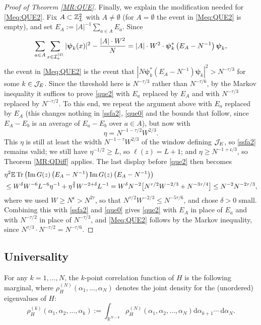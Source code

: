 \begin{proof}[Proof of Theorem \ref{MR:QUE}]
{Finally, we explain the modification needed for \eqref{Meq:QUE2}. Fix $A\subset\mathbb{Z}_{L}^{2}$ with $A\neq\emptyset$ (for $A=\emptyset$ the event in \eqref{Meq:QUE2} is empty), and set $E_{A}:=|A|^{-1}\sum_{a\in A}E_{a}$. Since
$$
\sum_{a\in A}\sum_{x\in{\cal I}^{(2)}_{a}}|\boldsymbol{\psi}_{k}(x)|^{2}-\frac{|A|\cdot W^{2}}{N}=|A|\cdot W^{2}\cdot\boldsymbol{\psi}_{k}^{*}\left(E_{A}-N^{-1}\right)\boldsymbol{\psi}_{k},
$$
the event in \eqref{Meq:QUE2} is the event that $|N\boldsymbol{\psi}_{k}^{*}(E_{A}-N^{-1})\boldsymbol{\psi}_{k}|^{2}>N^{-\tau/3}$ for some $k\in{\cal J}_{E}$. Since the threshold here is $N^{-\tau/3}$ rather than $N^{-\tau/6}$, by the Markov inequality it suffices to prove \eqref{que2} with $E_{a}$ replaced by $E_{A}$ and with $N^{-\tau/3}$ replaced by $N^{-\tau/2}$. To this end, we repeat the argument above with $E_{a}$ replaced by $E_{A}$ (this changes nothing in \eqref{ssfa2}, \eqref{que0} and the bounds that follow, since $E_{A}-E_{b}$ is an average of $E_{a}-E_{b}$ over $a\in A$), but now with
$$\eta=N^{-1-\tau/2}W^{2/3}.$$
This $\eta$ is still at least the width $N^{-1-\tau}W^{2/3}$ of the window defining ${\cal J}_{E}$, so \eqref{ssfa2} remains valid; we still have $\eta^{-1/2}\geq L$, so $\ell(z)=L+1$; and $\eta\geq N^{-1+\mathfrak c/3}$, so Theorem \ref{MR:QDiff} applies. The last display before \eqref{que2} then becomes
\begin{align*}
&\eta^2 \mathbb{E}  \operatorname{Tr} \left(\operatorname{Im} G(z)\left(E_A-N^{-1}\right) \operatorname{Im} G(z)\left(E_A-N^{-1}\right)\right)\\
&\le W^{\delta}W^{-6}L^{-6}\eta^{-1}+{\eta^{\frac32}W^{-2+\delta}}L^{-1}=W^{\delta}N^{-2}\big[N^{\tau/2}W^{-2/3}+N^{-3\tau/4}\big]\leq N^{-2}N^{-2\tau/3},
\end{align*}
where we used $W\geq N^{\mathfrak c}>N^{2\tau}$, so that $N^{\tau/2}W^{-2/3}\leq N^{-5\tau/6}$, and chose $\delta>0$ small. Combining this with \eqref{ssfa2} and \eqref{que0} gives \eqref{que2} with $E_{A}$ in place of $E_{a}$ and with $N^{-\tau/2}$ in place of $N^{-\tau/3}$, and \eqref{Meq:QUE2} follows by the Markov inequality, since $N^{\tau/3}\cdot N^{-\tau/2}=N^{-\tau/6}$.}
\end{proof}





 \subsection{Universality} 
For any $k=1,\ldots,N$, the $k$-point correlation function of $H$ is the following marginal, where $\rho^{(N)}_{H}(\alpha_{1},\ldots,\alpha_{N})$ denotes the joint density for the (unordered) eigenvalues of $H$:
\[
\rho_H^{(k)}\left(\alpha_1, \alpha_2, \ldots, \alpha_k\right):=\int_{\mathbb{R}^{N-k}} \rho_H^{(N)}\left(\alpha_1, \alpha_2, \ldots, \alpha_N\right) \mathrm{d} \alpha_{k+1} \cdots \mathrm{~d} \alpha_N.
\]

